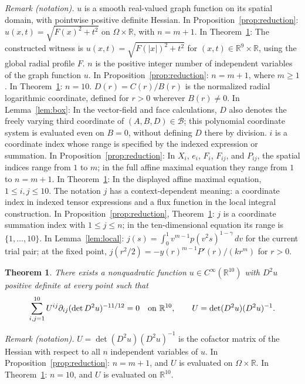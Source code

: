 \documentclass[11pt]{article}
\newcommand{\R}{\mathbb R}
\newtheorem{theorem}{Theorem}[section]
\theoremstyle{remark}
\begin{document}
\noindent\textit{Remark (notation).} $u$ is a smooth real-valued graph function on its spatial domain, with pointwise positive definite Hessian. In Proposition~\ref{prop:reduction}: $u(x,t)=\sqrt{F(x)^2+t^2}$ on $\Omega\times\R$, with $n=m+1$. In Theorem~\ref{thm:main}: The constructed witness is $u(x,t)=\sqrt{F(|x|)^2+t^2}$ for $(x,t)\in\R^9\times\R$, using the global radial profile $F$. $n$ is the positive integer number of independent variables of the graph function $u$. In Proposition~\ref{prop:reduction}: $n=m+1$, where $m\geq1$. In Theorem~\ref{thm:main}: $n=10$. $D(r)=C(r)/B(r)$ is the normalized radial logarithmic coordinate, defined for $r>0$ wherever $B(r)\ne0$. In Lemma~\ref{lem:box}: In the vector-field and face calculations, $D$ also denotes the freely varying third coordinate of $(A,B,D)\in\mathcal B$; this polynomial coordinate system is evaluated even on $B=0$, without defining $D$ there by division. $i$ is a coordinate index whose range is specified by the indexed expression or summation. In Proposition~\ref{prop:reduction}: In $X_i$, $e_i$, $F_i$, $F_{ij}$, and $P_{ij}$, the spatial indices range from $1$ to $m$; in the full affine maximal equation they range from $1$ to $n=m+1$. In Theorem~\ref{thm:main}: In the displayed affine maximal equation, $1\leq i,j\leq10$. The notation $j$ has a context-dependent meaning: a coordinate index in indexed tensor expressions and a flux function in the local integral construction. In Proposition~\ref{prop:reduction}, Theorem~\ref{thm:main}: $j$ is a coordinate summation index with $1\leq j\leq n$; in the ten-dimensional equation its range is $\{1,\ldots,10\}$. In Lemma~\ref{lem:local}: $j(s)=\int_0^1 v^{m-1}p(v^2s)^{1-\gamma}\,dv$ for the current trial pair; at the fixed point, $j(r^2/2)=-y(r)^{m-1}P'(r)/(kr^m)$ for $r>0$.


\begin{theorem}\label{thm:main}
There exists a nonquadratic function $u\in C^\infty(\R^{10})$
with $D^2u$ positive definite at every point such that
\[
 \sum_{i,j=1}^{10}U^{ij}\partial_{ij}
       (\det D^2u)^{-11/12}=0
 \quad\hbox{on }\R^{10},
 \qquad U=\det(D^2u)(D^2u)^{-1}.
\]
\end{theorem}

\noindent\textit{Remark (notation).} $U=\det(D^2u)(D^2u)^{-1}$ is the cofactor matrix of the Hessian with respect to all $n$ independent variables of $u$. In Proposition~\ref{prop:reduction}: $n=m+1$, and $U$ is evaluated on $\Omega\times\R$. In Theorem~\ref{thm:main}: $n=10$, and $U$ is evaluated on $\R^{10}$.
\end{document}

